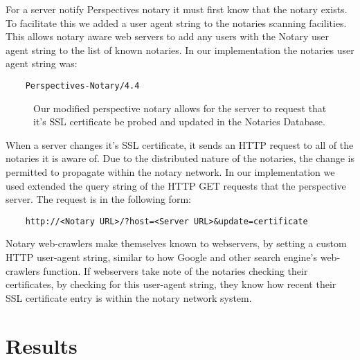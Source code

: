 \documentclass[preprint,review,12pt]{elsarticle}
\begin{document}
For a server notify Perspectives notary it must first know that the notary
exists. To facilitate this we added a user agent string to the notaries
scanning facilities. This allows notary aware web servers to add any users with
the Notary user agent string to the list of known notaries. In our
implementation the notaries user agent string was:

\begin{verbatim}
    Perspectives-Notary/4.4
\end{verbatim}

\begin{figure}[h]
\caption{Our modified perspective notary allows for the server to request that
    it's SSL certificate be probed and updated in the Notaries Database.}
\end{figure}

When a server changes it's SSL certificate, it sends an HTTP request to all of
the notaries it is aware of. Due to the distributed nature of the notaries, the
change is permitted to propagate within the notary network. In our
implementation we used extended the query string of the HTTP GET requests that
the perspective server. The request is in the following form:


\begin{verbatim}
    http://<Notary URL>/?host=<Server URL>&update=certificate
\end{verbatim}

Notary web-crawlers make themselves known to webservers, by setting a custom
HTTP user-agent string, similar to how Google and other search engine's
web-crawlers function. If webservers take note of the notaries checking their
certificates, by checking for this user-agent string, they know how recent their
SSL certificate entry is within the notary network system.

\section{Results}
\label{results}
\end{document}
